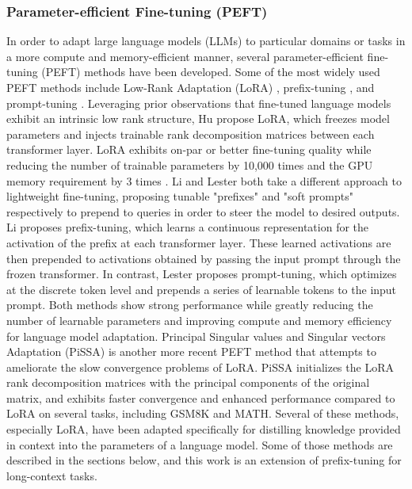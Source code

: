 \subsubsection{Parameter-efficient Fine-tuning (PEFT)}
\label{app:related-work-peft}
In order to adapt large language models (LLMs) to particular domains or tasks in a more compute and memory-efficient manner, several parameter-efficient fine-tuning (PEFT) methods have been developed. Some of the most widely used PEFT methods include Low-Rank Adaptation (LoRA) \cite{hu2022lora}, prefix-tuning \cite{li2021prefix}, and prompt-tuning \cite{lester2021power}.
Leveraging prior observations that fine-tuned language models exhibit an intrinsic low rank structure, Hu \etal propose LoRA, which freezes model parameters and injects trainable rank decomposition matrices between each transformer layer. LoRA exhibits on-par or better fine-tuning quality while reducing the number of trainable parameters by 10,000 times and the GPU memory requirement by 3 times \cite{hu2022lora}.
Li \etal and Lester \etal both take a different approach to lightweight fine-tuning, proposing tunable "prefixes" and "soft prompts" respectively to prepend to queries in order to steer the model to desired outputs. Li \etal proposes prefix-tuning, which learns a continuous representation for the activation of the prefix at each transformer layer. These learned activations are then prepended to activations obtained by passing the input prompt through the frozen transformer. In contrast, Lester \etal proposes prompt-tuning, which optimizes at the discrete token level and prepends a series of learnable tokens to the input prompt. Both methods show strong performance while greatly reducing the number of learnable parameters and improving compute and memory efficiency for language model adaptation.
Principal Singular values and Singular vectors Adaptation (PiSSA) \cite{meng2024pissa} is another more recent PEFT method that attempts to ameliorate the slow convergence problems of LoRA. PiSSA initializes the LoRA rank decomposition matrices with the principal components of the original matrix, and exhibits faster convergence and enhanced performance compared to LoRA on several tasks, including GSM8K and MATH.
Several of these methods, especially LoRA, have been adapted specifically for distilling knowledge provided in context into the parameters of a language model. Some of those methods are described in the sections below, and this work is an extension of prefix-tuning for long-context tasks.
